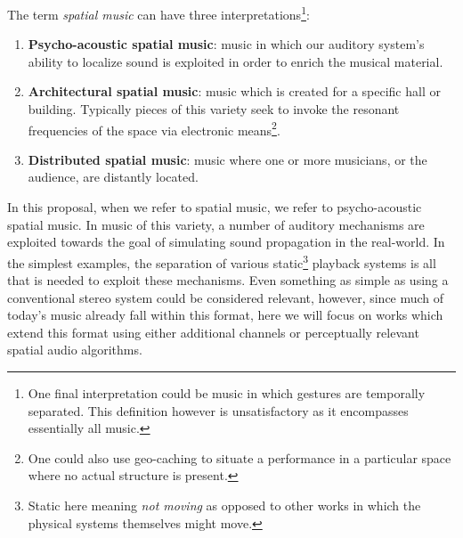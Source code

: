 The term \textit{spatial music} can have three interpretations\footnote{One final interpretation could be music in which gestures are temporally separated. This definition however is unsatisfactory as it encompasses essentially all music.}:
\begin{enumerate}
    \item \textbf{Psycho-acoustic spatial music}: music in which our auditory system's ability to localize sound is exploited in order to enrich the musical material. 
    \item \textbf{Architectural spatial music}: music which is created for a specific hall or building. Typically pieces of this variety seek to invoke the resonant frequencies of the space via electronic means\footnote{One could also use geo-caching to situate a performance in a particular space where no actual structure is present.}. 
    \item \textbf{Distributed spatial music}: music where one or more musicians, or the audience, are distantly located. 
\end{enumerate}


In this proposal, when we refer to spatial music, we refer to psycho-acoustic spatial music. In music of this variety, a number of auditory mechanisms are exploited towards the goal of simulating sound propagation in the real-world. In the simplest examples, the separation of various static\footnote{Static here meaning \textit{not moving} as opposed to other works in which the physical systems themselves might move.} playback systems is all that is needed to exploit these mechanisms. Even something as simple as using a conventional stereo system could be considered relevant, however, since much of today's music already fall within this format, here we will focus on works which extend this format using either additional channels or perceptually relevant spatial audio algorithms. 

